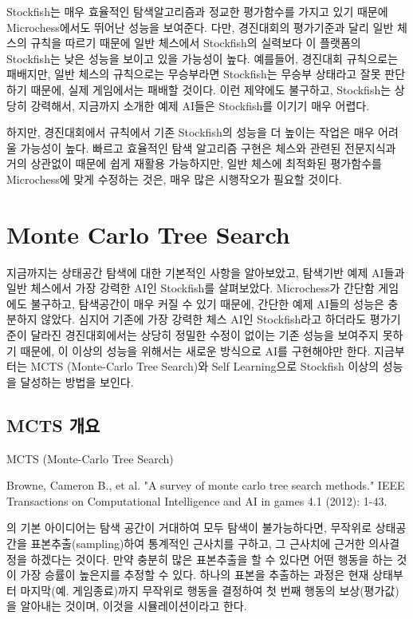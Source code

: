 \documentclass[letterpaper,10pt,english]{sphinxmanual}
\begin{document}
Stockfish는 매우 효율적인 탐색알고리즘과 정교한 평가함수를 가지고 있기 때문에 Microchess에서도 뛰어난 성능을 보여준다.
다만, 경진대회의 평가기준과 달리 일반 체스의 규칙을 따르기 때문에
일반 체스에서 Stockfish의 실력보다 이 플랫폼의 Stockfish는 낮은 성능을 보이고 있을 가능성이 높다.
예를들어, 경진대회 규칙으로는 패배지만, 일반 체스의 규칙으로는 무승부라면 Stockfish는 무승부 상태라고 잘못 판단하기 때문에, 실제 게임에서는 패배할 것이다.
이런 제약에도 불구하고, Stockfish는 상당히 강력해서, 지금까지 소개한 예제 AI들은 Stockfish를 이기기 매우 어렵다.

하지만, 경진대회에서 규칙에서 기존 Stockfish의 성능을 더 높이는 작업은 매우 어려울 가능성이 높다.
빠르고 효율적인 탐색 알고리즘 구현은 체스와 관련된 전문지식과 거의 상관없이 때문에 쉽게 재활용 가능하지만,
일반 체스에 최적화된 평가함수를 Microchess에 맞게 수정하는 것은, 매우 많은 시행작오가 필요할 것이다.

\newpage


\section{Monte Carlo Tree Search}
\label{\detokenize{04-mcts::doc}}\label{\detokenize{04-mcts:monte-carlo-tree-search}}
지금까지는 상태공간 탐색에 대한 기본적인 사항을 알아보았고, 탐색기반 예제 AI들과 일반 체스에서 가장 강력한 AI인 Stockfish를 살펴보았다.
Microchess가 간단함 게임에도 불구하고, 탐색공간이 매우 커질 수 있기 때문에, 간단한 예제 AI들의 성능은 충분하지 않았다.
심지어 기존에 가장 강력한 체스 AI인 Stockfish라고 하더라도
평가기준이 달라진 경진대회에서는 상당히 정밀한 수정이 없이는 기존 성능을 보여주지 못하기 때문에,
이 이상의 성능을 위해서는 새로운 방식으로 AI를 구현해야만 한다.
지금부터는 MCTS (Monte-Carlo Tree Search)와 Self Learning으로 Stockfish 이상의 성능을 달성하는 방법을 보인다.


\subsection{MCTS 개요}
\label{\detokenize{04-mcts:mcts}}
MCTS (Monte-Carlo Tree Search) %
\begin{footnote}[1]\sphinxAtStartFootnote
Browne, Cameron B., et al. "A survey of monte carlo tree search methods." IEEE Transactions on Computational Intelligence and AI in games 4.1 (2012): 1-43.
%
\end{footnote} 의 기본 아이디어는 탐색 공간이 거대하여 모두 탐색이 불가능하다면,
무작위로 상태공간을 표본추출(sampling)하여 통계적인 근사치를 구하고, 그 근사치에 근거한 의사결정을 하겠다는 것이다.
만약 충분히 많은 표본추출을 할 수 있다면 어떤 행동을 하는 것이 가장 승률이 높은지를 추정할 수 있다.
하나의 표본을 추출하는 과정은 현재 상태부터 마지막(예. 게임종료)까지 무작위로 행동을 결정하여 첫 번째 행동의 보상(평가값)을 알아내는 것이며,
이것을 시뮬레이션이라고 한다.
\end{document}
